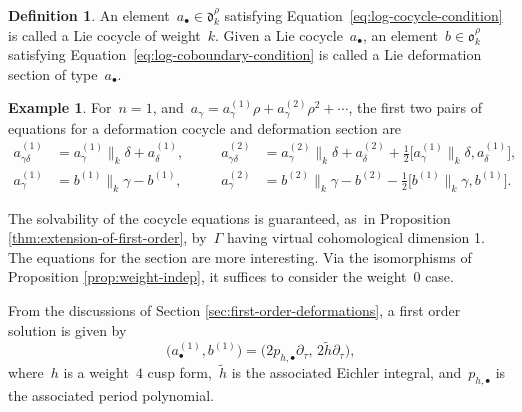 \documentclass[JEP,XML,SOM,Unicode,published]{cedram}
\let\oldbullet\bullet
\renewcommand{\bullet}{{\scriptscriptstyle\oldbullet}}
\theoremstyle{plain}
\theoremstyle{definition}
\newtheorem{definition}[theoremcounter]{Definition}
\newtheorem{example}[theoremcounter]{Example}
\newcommand{\tx}{\text}
\newcommand{\frakd}{\ensuremath{\mathfrak{d}}}
\newcommand{\frako}{\ensuremath{\mathfrak{o}}}
\let\Ga\Gamma
\let\ga\gamma
\begin{document}
\begin{definition}\label{def:log-deformation-data}
An element~$a_\bullet\in\frakd_k^\rho$ satisfying Equation~\eqref{eq:log-cocycle-condition} is called a Lie cocycle of weight~$k$. Given a Lie cocycle~$a_\bullet$, an element~$b\in\frako_k^\rho$ satisfying Equation~\eqref{eq:log-coboundary-condition} is called a Lie deformation section of type~$a_\bullet$.
\end{definition}

\begin{example}
For~$n=1$, and~$a_\ga = a^{(1)}_\ga\rho + a^{(2)}_\ga\rho^2+\cdots$, the first two pairs of equations for a deformation cocycle and deformation section are\vspace*{-3pt}
\begin{equation}\label{eq:second-order-log}
\begin{alignedat}{2}
a^{(1)}_{\ga\delta} &= a^{(1)}_\ga\big\|_k\delta + a^{(1)}_\delta
\tx{,}\qquad&
a^{(2)}_{\ga\delta} &= a^{(2)}_\ga\big\|_k\delta + a^{(2)}_\delta + \tfrac{1}{2} \big[a^{(1)}_\ga\big\|_k\delta,a^{(1)}_\delta \big]
\tx{,}\\
a^{(1)}_\ga &= b^{(1)}\big\|_k\ga - b^{(1)}
\tx{,}\qquad&
a^{(2)}_\ga &= b^{(2)}\big\|_k\ga - b^{(2)} - \tfrac{1}{2} \big[ b^{(1)}\big\|_k\ga,b^{(1)} \big]
\tx{.}
\end{alignedat}
\end{equation}
\end{example}

The solvability of the cocycle equations is guaranteed, as~in Proposition \ref{thm:extension-of-first-order}, by~$\Ga$ having virtual cohomological dimension 1. The equations for the section are more interesting. Via the isomorphisms of Proposition \ref{prop:weight-indep}, it suffices to consider the weight~$0$ case.

From the discussions of Section \ref{sec:first-order-deformations}, a first order solution is given by
\begin{equation*}
\bigl(a^{(1)}_\bullet,b^{(1)} \bigr)
=
\bigl(2p_{h,\bullet}\partial_\tau,\, 2\tilde{h}\partial_\tau \bigr)
\tx{,}
\end{equation*}
where~$h$ is a weight~$4$ cusp form,~$\tilde{h}$ is the associated Eichler integral, and~$p_{h,\bullet}$ is the associated period polynomial.
\end{document}
